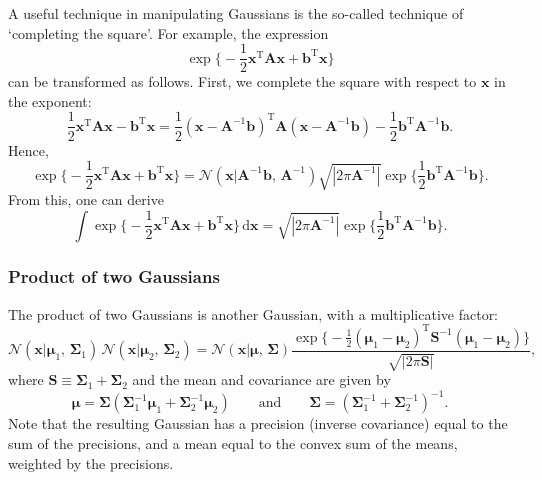 A useful technique in manipulating Gaussians is the so-called technique of `completing the square'. For example, the expression
\begin{equation}
	\exp\Big\{-\frac{1}{2}\mathbf{x}^\text{T}\mathbf{A}\mathbf{x} + \mathbf{b}^\text{T}\mathbf{x}\Big\}
\end{equation}
can be transformed as follows. First, we complete the square with respect to $\mathbf{x}$ in the exponent:
\begin{equation}
	\frac{1}{2}\mathbf{x}^\text{T}\mathbf{A}\mathbf{x} - \mathbf{b}^\text{T}\mathbf{x}
	= \frac{1}{2}(\mathbf{x} - \mathbf{A}^{-1}\mathbf{b})^\text{T}\mathbf{A}(\mathbf{x} - \mathbf{A}^{-1}\mathbf{b}) - \frac{1}{2}\mathbf{b}^\text{T}\mathbf{A}^{-1}\mathbf{b}.
\end{equation}
Hence,
\begin{equation}
	\exp\Big\{-\frac{1}{2}\mathbf{x}^\text{T}\mathbf{A}\mathbf{x} + \mathbf{b}^\text{T}\mathbf{x}\Big\}
	= \mathcal{N}(\mathbf{x}|\mathbf{A}^{-1}\mathbf{b},\, \mathbf{A}^{-1})\sqrt{|2\pi\mathbf{A}^{-1}|}\exp\Big\{\frac{1}{2}\mathbf{b}^\text{T}\mathbf{A}^{-1}\mathbf{b}\Big\}.
\end{equation}
From this, one can derive
\begin{equation}
	\int \exp\Big\{-\frac{1}{2}\mathbf{x}^\text{T}\mathbf{A}\mathbf{x} + \mathbf{b}^\text{T}\mathbf{x}\Big\}\,\mathrm{d}\mathbf{x}
	= \sqrt{|2\pi\mathbf{A}^{-1}|}\exp\Big\{\frac{1}{2}\mathbf{b}^\text{T}\mathbf{A}^{-1}\mathbf{b}\Big\}.
\end{equation}

\subsubsection{Product of two Gaussians}

The product of two Gaussians is another Gaussian, with a multiplicative factor:
\begin{equation}
\label{eq:product-of-2-gaussians}
	\mathcal{N}(\mathbf{x}|\boldsymbol{\mu}_1,\, \boldsymbol{\Sigma}_1)\,\mathcal{N}(\mathbf{x}|\boldsymbol{\mu}_2,\, \boldsymbol{\Sigma}_2)
	= \mathcal{N}(\mathbf{x}|\boldsymbol{\mu},\, \boldsymbol{\Sigma})\frac{\exp\big\{-\frac{1}{2}(\boldsymbol{\mu}_1 - \boldsymbol{\mu}_2)^\text{T}\mathbf{S}^{-1}(\boldsymbol{\mu}_1 - \boldsymbol{\mu}_2)\big\}}{\sqrt{|2\pi\mathbf{S}|}},
\end{equation}
where $\mathbf{S} \equiv \boldsymbol{\Sigma}_1 + \boldsymbol{\Sigma}_2$ and the mean and covariance are given by
\begin{equation}
	\boldsymbol{\mu}
	= \boldsymbol{\Sigma}(\boldsymbol{\Sigma}_1^{-1}\boldsymbol{\mu}_1 + \boldsymbol{\Sigma}_2^{-1}\boldsymbol{\mu}_2)
	\qquad \text{and} \qquad
	\boldsymbol{\Sigma}
	= (\boldsymbol{\Sigma}_1^{-1} + \boldsymbol{\Sigma}_2^{-1})^{-1}.
\end{equation}
Note that the resulting Gaussian has a precision (inverse covariance) equal to the sum of the precisions, and a mean equal to the convex sum of the means, weighted by the precisions.

